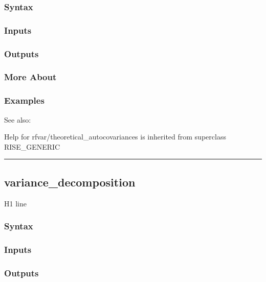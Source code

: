 \documentclass[letterpaper,10pt,english]{sphinxmanual}
\begin{document}
\subsubsection{Syntax}
\label{classes/models/@rfvar/rfvar:id151}

\subsubsection{Inputs}
\label{classes/models/@rfvar/rfvar:id152}

\subsubsection{Outputs}
\label{classes/models/@rfvar/rfvar:id153}

\subsubsection{More About}
\label{classes/models/@rfvar/rfvar:id154}

\subsubsection{Examples}
\label{classes/models/@rfvar/rfvar:id155}
See also:

Help for rfvar/theoretical\_autocovariances is inherited from superclass RISE\_GENERIC


\bigskip\hrule{}\bigskip



\subsection{variance\_decomposition}
\label{classes/models/@rfvar/rfvar:id156}\label{classes/models/@rfvar/rfvar:variance-decomposition}
H1 line


\subsubsection{Syntax}
\label{classes/models/@rfvar/rfvar:id157}

\subsubsection{Inputs}
\label{classes/models/@rfvar/rfvar:id158}

\subsubsection{Outputs}
\label{classes/models/@rfvar/rfvar:id159}
\end{document}
